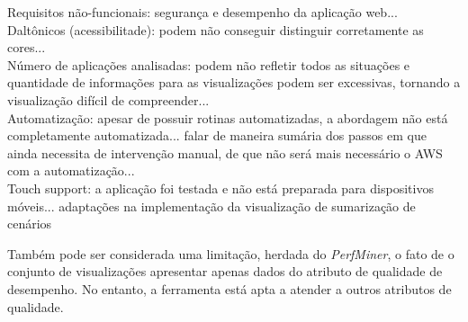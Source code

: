 {\color{red}Requisitos não-funcionais: segurança e desempenho da aplicação web...}\\
{\color{red}Daltônicos (acessibilitade): podem não conseguir distinguir corretamente as cores...}\\
{\color{red}Número de aplicações analisadas: podem não refletir todos as situações e quantidade de informações para as visualizações podem ser excessivas, tornando a visualização difícil de compreender...}\\
{\color{red}Automatização: apesar de possuir rotinas automatizadas, a abordagem não está completamente automatizada... falar de maneira sumária dos passos em que ainda necessita de intervenção manual, de que não será mais necessário o AWS com a automatização...}\\
{\color{red}Touch support: a aplicação foi testada e não está preparada para dispositivos móveis...}
{\color{red}adaptações na implementação da visualização de sumarização de cenários}

Também pode ser considerada uma limitação, herdada do \textit{PerfMiner}, o fato de o conjunto de visualizações apresentar apenas dados do atributo de qualidade de  desempenho. No entanto, a ferramenta está apta a atender a outros atributos de qualidade.